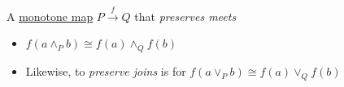 A \href{doc/1 math/Seven Sketches in Compositionality/Chapter 1: Generative Effects/4 Monotone maps/1 Monotone map}{monotone map} $P \xrightarrow{f} Q$ that \emph{preserves meets}

\begin{itemize}
    \item  $f(a \land_P b) \cong f(a) \land_Q f(b)$
    \item Likewise, to \emph{preserve joins} is for $f(a \lor_P b) \cong f(a) \lor_Q f(b)$
  \end{itemize}